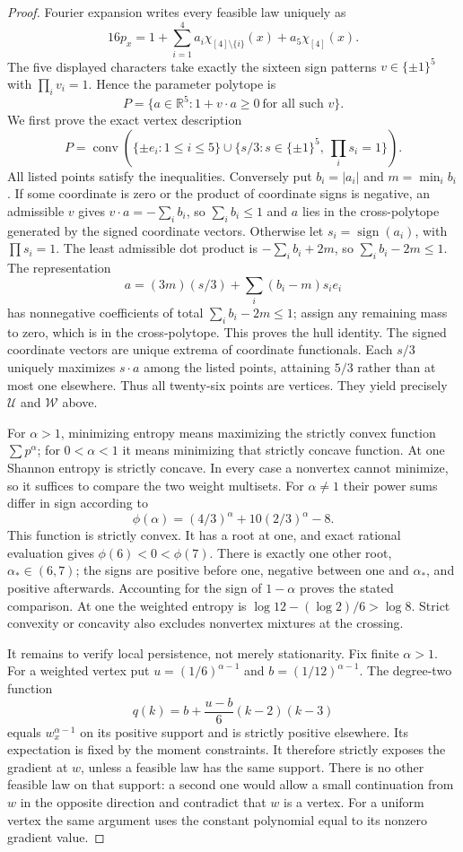 \begin{proof}
Fourier expansion writes every feasible law uniquely as
\[
 16p_x=1+\sum_{i=1}^4a_i\chi_{[4]\setminus\{i\}}(x)
                   +a_5\chi_{[4]}(x).
\]
The five displayed characters take exactly the sixteen sign patterns
$v\in\{\pm1\}^5$ with $\prod_i v_i=1$. Hence the parameter polytope is
\[
 P=\{a\in\mathbb R^5:1+v\cdot a\ge0\ \text{for all such }v\}.
\]
We first prove the exact vertex description
\[
 P=\operatorname{conv}\left(
 \{\pm e_i:1\le i\le5\}
 \cup\{s/3:s\in\{\pm1\}^5,\ \prod_i s_i=1\}\right).
\]
All listed points satisfy the inequalities. Conversely put
$b_i=|a_i|$ and $m=\min_i b_i$. If some coordinate is zero or the
product of coordinate signs is negative, an admissible $v$ gives
$v\cdot a=-\sum_i b_i$, so $\sum_i b_i\le1$ and $a$ lies in the
cross-polytope generated by the signed coordinate vectors.
Otherwise let $s_i=\operatorname{sign}(a_i)$, with $\prod s_i=1$.
The least admissible dot product is $-\sum_i b_i+2m$, so
$\sum_i b_i-2m\le1$. The representation
\[
 a=(3m)(s/3)+\sum_i(b_i-m)s_i e_i
\]
has nonnegative coefficients of total $\sum_i b_i-2m\le1$;
assign any remaining mass to zero, which is in the cross-polytope.
This proves the hull identity. The signed coordinate vectors are
unique extrema of coordinate functionals. Each $s/3$ uniquely maximizes
$s\cdot a$ among the listed points, attaining $5/3$ rather than at
most one elsewhere. Thus all twenty-six points are vertices.
They yield precisely $\mathcal U$ and $\mathcal W$ above.

For $\alpha>1$, minimizing entropy means maximizing the strictly
convex function $\sum p^\alpha$; for $0<\alpha<1$ it means minimizing
that strictly concave function. At one Shannon entropy is strictly
concave. In every case a nonvertex cannot minimize, so it suffices
to compare the two weight multisets. For $\alpha\ne1$ their power sums
differ in sign according to
\[
 \phi(\alpha)=(4/3)^\alpha+10(2/3)^\alpha-8.
\]
This function is strictly convex. It has a root at one, and exact
rational evaluation gives $\phi(6)<0<\phi(7)$. There is exactly
one other root, $\alpha_*\in(6,7)$; the signs are positive before
one, negative between one and $\alpha_*$, and positive afterwards.
Accounting for the sign of $1-\alpha$ proves the stated comparison.
At one the weighted entropy is
$\log12-(\log2)/6>\log8$. Strict convexity or concavity also excludes
nonvertex mixtures at the crossing.

It remains to verify local persistence, not merely stationarity.
Fix finite $\alpha>1$. For a weighted vertex put
$u=(1/6)^{\alpha-1}$ and $b=(1/12)^{\alpha-1}$. The degree-two function
\[
 q(k)=b+\frac{u-b}{6}(k-2)(k-3)
\]
equals $w_x^{\alpha-1}$ on its positive support and is strictly
positive elsewhere. Its expectation is fixed by the moment constraints.
It therefore strictly exposes the gradient at $w$, unless a feasible
law has the same support. There is no other feasible law on that
support: a second one would allow a small continuation from $w$ in
the opposite direction and contradict that $w$ is a vertex.
For a uniform vertex the same argument uses the constant polynomial
equal to its nonzero gradient value.


\end{proof}
